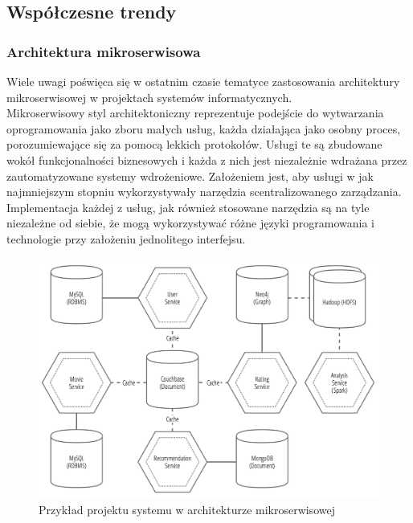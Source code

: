 \documentclass[12pt,twoside]{article}
\begin{document}
\subsection{Współczesne trendy}\label{wspuxf3ux142czesne-trendy}

\subsubsection{Architektura
mikroserwisowa}\label{architektura-mikroserwisowa}

Wiele uwagi poświęca się w ostatnim czasie tematyce zastosowania
architektury mikroserwisowej w projektach systemów informatycznych.\\
Mikroserwisowy styl architektoniczny reprezentuje podejście do
wytwarzania oprogramowania jako zboru małych usług, każda działająca
jako osobny proces, porozumiewające się za pomocą lekkich protokołów.
Usługi te są zbudowane wokół funkcjonalności biznesowych i każda z nich
jest niezależnie wdrażana przez zautomatyzowane systemy wdrożeniowe.
Założeniem jest, aby usługi w jak najmniejszym stopniu wykorzystywały
narzędzia scentralizowanego zarządzania. Implementacja każdej z usług,
jak również stosowane narzędzia są na tyle niezależne od siebie, że mogą
wykorzystywać różne języki programowania i technologie przy założeniu
jednolitego interfejsu.

\begin{figure}[!ht]
\centering
\includegraphics[resolution=500]{graphics/microservice-example.png}
\caption{Przykład projektu systemu w architekturze mikroserwisowej\autocite{bastani2015springcloud}}
\end{figure}
\end{document}

